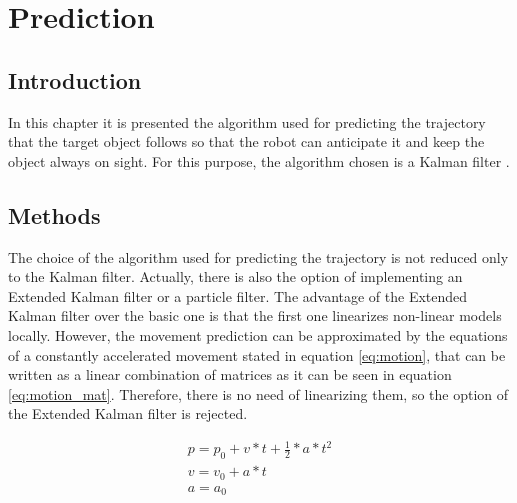 
\chapter{Prediction} %
\label{chap:prediction}
\section{Introduction}
In this chapter it is presented the algorithm used for predicting the trajectory that the target object follows so that the robot can anticipate it and keep the object always on sight.
For this purpose, the algorithm chosen is a Kalman filter \cite{kalman}.

\section{Methods}
The choice of the algorithm used for predicting the trajectory is not reduced only to the Kalman filter. Actually, there is also the option of implementing an Extended Kalman filter or a particle filter. The advantage of the Extended Kalman filter over the basic one is that the first one linearizes non-linear models locally. However, the movement prediction can be approximated by the equations of a constantly accelerated movement stated in equation \ref{eq:motion}, that can be written as a linear combination of matrices as it can be seen in equation \ref{eq:motion_mat}. Therefore, there is no need of linearizing them, so the option of the Extended Kalman filter is rejected.

\begin{equation}
\begin{multlined}
p=p_{0}+v*t+\frac{1}{2}*a*t^{2} \\
v=v_{0}+a*t \\
a=a_{0} \\
\end{multlined}
\label{eq:motion}
\end{equation}

